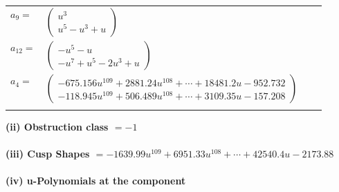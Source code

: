 \documentclass[1p]{elsarticle_modified}
\theoremstyle{definition}
\begin{document}
\begin{tabular}{m{7pt} m{180pt} m{7pt} m{180pt} }
\flushright $a_{9}=$&$\begin{pmatrix}u^3\\u^5- u^3+u\end{pmatrix}$ \\
\flushright $a_{12}=$&$\begin{pmatrix}- u^5- u\\- u^7+u^5-2 u^3+u\end{pmatrix}$ \\
\flushright $a_{4}=$&$\begin{pmatrix}-675.156 u^{109}+2881.24 u^{108}+\cdots+18481.2 u-952.732\\-118.945 u^{109}+506.489 u^{108}+\cdots+3109.35 u-157.208\end{pmatrix}$\\&\end{tabular}
\flushleft \textbf{(ii) Obstruction class $= -1$}\\~\\
\flushleft \textbf{(iii) Cusp Shapes $= -1639.99 u^{109}+6951.33 u^{108}+\cdots+42540.4 u-2173.88$}\\~\\
\newpage\renewcommand{\arraystretch}{1}
\flushleft \textbf{(iv) u-Polynomials at the component}\newline \\
\end{document}
